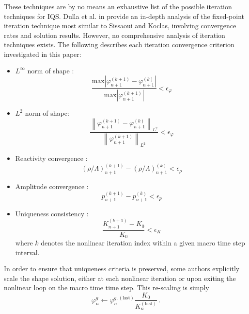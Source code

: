 \documentclass{elsarticle}
\def\answer#1#2{{\color{blue}
     \begin{tabular}{|l|}
       \hline{ #1}\\\hline{ #2}\\\hline
     \end{tabular}}}
\def\comm#1{{\color{magenta}
     \begin{tabular}{|l|}
       \hline #1 \\\hline
     \end{tabular}}}
\newcommand{\be}{\begin{equation}}
\newcommand{\ee}{\end{equation}}
\newcommand{\norm}[1]{\left\lVert#1\right\rVert_{L^2}}
\begin{document}
These techniques are by no means an exhaustive list of the possible iteration techniques for IQS. Dulla et al. in \cite{Dulla2008} provide an 
in-depth analysis of the fixed-point iteration technique most similar to Sissaoui and Koclas, involving convergence rates and solution results.  
However, no comprehensive analysis of iteration techniques exists. The following describes 
each iteration convergence criterion investigated in this paper:

\begin{itemize}
\item $L^\infty$ norm of shape \cite{Monier_diss}: 
\[
\frac{\text{max}\left|\varphi_{n+1}^{(k+1)} - \varphi_{n+1}^{(k)}\right|}{\text{max}\left|\varphi_{n+1}^{(k+1)}\right|} < \epsilon_{\varphi}
\]
\item $L^2$ norm of shape: 
\[
\frac{\norm{\varphi_{n+1}^{(k+1)} - \varphi_{n+1}^{(k)}}}{\norm{\varphi_{n+1}^{(k+1)}}} < \epsilon_{\varphi}
\]
\item Reactivity convergence \cite{Monier_diss}: 
\[
\left(\rho/\Lambda\right)^{(k+1)}_{n+1} - \left(\rho/\Lambda\right)^{(k)}_{n+1} < \epsilon_{\rho}
\]
\item Amplitude convergence \cite{Monier_diss}: 
\[
p_{n+1}^{(k+1)} - p_{n+1}^{(k)} < \epsilon_p
\]
\item Uniqueness consistency \cite{Monier_diss}: 
\[
\frac{K_{n+1}^{(k+1)} - K_0}{K_0} < \epsilon_K
\]
where $k$ denotes the nonlinear iteration index within a given macro time step interval.
\end{itemize}

In order to ensure that uniqueness criteria is preserved, some authors \cite{Monier_diss,Dulla2008} explicitly scale the shape solution, 
either at each nonlinear iteration or upon exiting the nonlinear loop on the macro time time step. This re-scaling is simply
\be 
\varphi^{g}_n \leftarrow \varphi^{g,(\text{last})}_n \frac{K_0}{K^{(\text{last})}_{n}} \,.
\label{eq:shape_scale}
\ee

\end{document}
